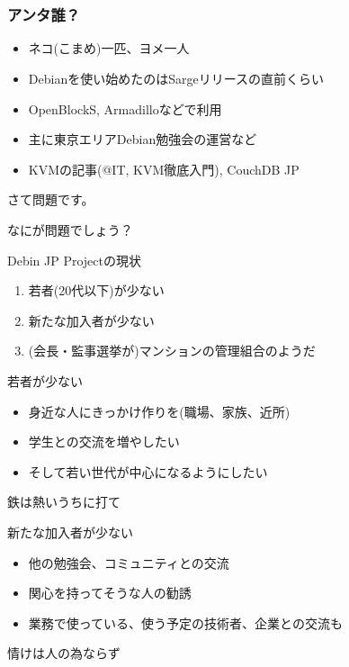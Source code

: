 \frame{\titlepage{}}

\section{}

\begin{frame}
 \frametitle{アンタ誰？}
  \begin{itemize}
   \item ネコ(こまめ)一匹、ヨメ一人
   \item Debianを使い始めたのはSargeリリースの直前くらい
   \item OpenBlockS, Armadilloなどで利用
   \item 主に東京エリアDebian勉強会の運営など
   \item KVMの記事(@IT, KVM徹底入門), CouchDB JP
  \end{itemize}
\end{frame}

\begin{frame}{さて問題です。}

{\Huge なにが問題でしょう？}

\end{frame}

\begin{frame}{Debin JP Projectの現状}
 \begin{enumerate}
  \item 若者(20代以下)が少ない
  \item 新たな加入者が少ない
  \item (会長・監事選挙が)マンションの管理組合のようだ
 \end{enumerate}
\end{frame}

\begin{frame}{若者が少ない}
 \begin{itemize}
  \item 身近な人にきっかけ作りを(職場、家族、近所)
  \item 学生との交流を増やしたい
  \item そして若い世代が中心になるようにしたい
 \end{itemize}
 \begin{center}
  {\Huge 鉄は熱いうちに打て}
 \end{center}
\end{frame}

\begin{frame}{新たな加入者が少ない}
 \begin{itemize}
  \item 他の勉強会、コミュニティとの交流
  \item 関心を持ってそうな人の勧誘
  \item 業務で使っている、使う予定の技術者、企業との交流も
 \end{itemize}
 \begin{center}
  {\Huge 情けは人の為ならず}
 \end{center}
\end{frame}

